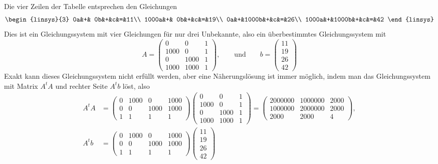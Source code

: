 \begin{loesung}
Die vier Zeilen der Tabelle entsprechen den Gleichungen
\[
\begin{linsys}{3}
   0a&+&   0b&+&c&=&11\\
1000a&+&   0b&+&c&=&19\\
   0a&+&1000b&+&c&=&26\\
1000a&+&1000b&+&c&=&42
\end{linsys}
\]
Dies ist ein Gleichungssystem mit vier Gleichungen für nur drei Unbekannte,
also ein überbestimmtes Gleichungssystem mit
\[
A=\begin{pmatrix}
   0&   0&1\\
1000&   0&1\\
   0&1000&1\\
1000&1000&1
\end{pmatrix}
,\qquad\text{und}\qquad b=\begin{pmatrix}
11\\
19\\
26\\
42
\end{pmatrix}
\]
Exakt kann dieses Gleichungssystem nicht erfüllt werden, aber eine
Näherungs\-lösung ist immer möglich, indem man das Gleichungssystem
mit Matrix $A^tA$ und rechter Seite $A^tb$ löst, also
\begin{align*}
A^tA&=
\begin{pmatrix}
0&1000&   0&1000\\
0&   0&1000&1000\\
1&   1&   1&   1
\end{pmatrix}
\begin{pmatrix}
   0&   0&1\\
1000&   0&1\\
   0&1000&1\\
1000&1000&1
\end{pmatrix}
=
\begin{pmatrix}
2000000&1000000&2000\\
1000000&2000000&2000\\
   2000&   2000&   4
\end{pmatrix},
\\
A^tb&=
\begin{pmatrix}
0&1000&   0&1000\\
0&   0&1000&1000\\
1&   1&   1&   1
\end{pmatrix}
\begin{pmatrix}
11\\19\\26\\42

\end{pmatrix}
\end{align*}
\end{loesung}
